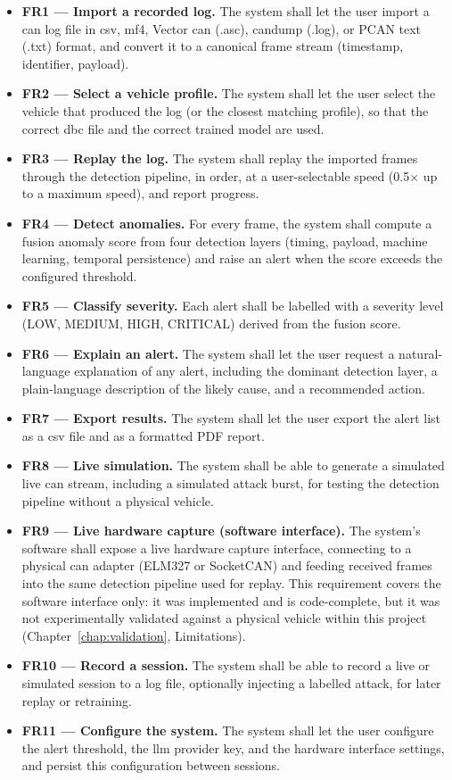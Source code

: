 \begin{itemize}
    \item \textbf{FR1 --- Import a recorded log.} The system shall let the user import a \gls{can} log file in \gls{csv}, \gls{mf4}, Vector \gls{can} (.asc), candump (.log), or PCAN text (.txt) format, and convert it to a canonical frame stream (timestamp, identifier, payload).
    \item \textbf{FR2 --- Select a vehicle profile.} The system shall let the user select the vehicle that produced the log (or the closest matching profile), so that the correct \gls{dbc} file and the correct trained model are used.
    \item \textbf{FR3 --- Replay the log.} The system shall replay the imported frames through the detection pipeline, in order, at a user-selectable speed (0.5$\times$ up to a maximum speed), and report progress.
    \item \textbf{FR4 --- Detect anomalies.} For every frame, the system shall compute a fusion anomaly score from four detection layers (timing, payload, machine learning, temporal persistence) and raise an alert when the score exceeds the configured threshold.
    \item \textbf{FR5 --- Classify severity.} Each alert shall be labelled with a severity level (LOW, MEDIUM, HIGH, CRITICAL) derived from the fusion score.
    \item \textbf{FR6 --- Explain an alert.} The system shall let the user request a natural-language explanation of any alert, including the dominant detection layer, a plain-language description of the likely cause, and a recommended action.
    \item \textbf{FR7 --- Export results.} The system shall let the user export the alert list as a \gls{csv} file and as a formatted PDF report.
    \item \textbf{FR8 --- Live simulation.} The system shall be able to generate a simulated live \gls{can} stream, including a simulated attack burst, for testing the detection pipeline without a physical vehicle.
    \item \textbf{FR9 --- Live hardware capture (software interface).} The system's software shall expose a live hardware capture interface, connecting to a physical \gls{can} adapter (ELM327 or SocketCAN) and feeding received frames into the same detection pipeline used for replay. This requirement covers the software interface only: it was implemented and is code-complete, but it was not experimentally validated against a physical vehicle within this project (Chapter~\ref{chap:validation}, Limitations).
    \item \textbf{FR10 --- Record a session.} The system shall be able to record a live or simulated session to a log file, optionally injecting a labelled attack, for later replay or retraining.
    \item \textbf{FR11 --- Configure the system.} The system shall let the user configure the alert threshold, the \gls{llm} provider key, and the hardware interface settings, and persist this configuration between sessions.
\end{itemize}

